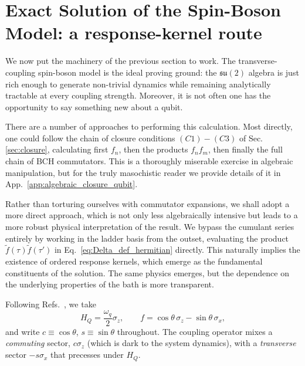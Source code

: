 \section{Exact Solution of the Spin-Boson Model: a response-kernel route}
\label{sec:qubit_direct_response_v5}

We now put the machinery of the previous section to work. The transverse-coupling
spin-boson model is the ideal proving ground: the $\mathfrak{su}(2)$ algebra is
just rich enough to generate non-trivial dynamics while remaining analytically
tractable at every coupling strength. Moreover, it is not often one has the opportunity to say something new about a qubit. 

There are a number of approaches to performing this calculation. Most directly, one could follow the chain of closure conditions $(C1)-(C3)$ of Sec. \ref{sec:closure}, calculating first $f_n$, then the products $f_nf_m$, then finally the full chain of BCH commutators. This is a thoroughly miserable exercise in algebraic manipulation, but for the truly masochistic reader we provide details of it in App.~\ref{app:algebraic_closure_qubit}.

Rather than torturing ourselves with commutator expansions, we shall adopt a more direct approach, which is not only less algebraically intensive but leads to a more robust physical interpretation of the result. We bypass the cumulant series entirely by working in the ladder basis from the outset, evaluating the product $\tilde{f}(\tau)\tilde{f}(\tau')$ in Eq.~\eqref{eq:Delta_def_hermitian} directly. This naturally implies the existence of ordered response kernels, which emerge as the fundamental constituents of the solution. The same physics emerges, but the dependence on the underlying properties of the bath is more transparent.

Following Refs.~\cite{cresserWeakUltrastrongCoupling2021a,hovhannisyanHamiltonianMeanForce2020}, we take
\begin{equation}
    H_Q = \frac{\omega_q}{2}\sigma_z,
    \qquad
    f = \cos\theta\,\sigma_z - \sin\theta\,\sigma_x,
    \label{eq:qubit_setup}
\end{equation}
and write $c\equiv\cos\theta$, $s\equiv\sin\theta$ throughout. The coupling
operator mixes a \emph{commuting} sector, $c\sigma_z$ (which is dark to the
system dynamics), with a \emph{transverse} sector $-s\sigma_x$ that precesses
under $H_Q$.

